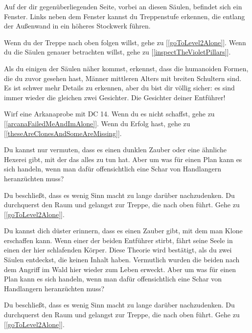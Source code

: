 Auf der dir gegenüberliegenden Seite, vorbei an diesen Säulen, befindet sich ein Fenster. Links neben dem Fenster kannst du Treppenstufe erkennen, die entlang der Außenwand in ein höheres Stockwerk führen.

Wenn du der Treppe nach oben folgen willst, gehe zu [\ref{goToLevel2Alone}].
Wenn du die Säulen genauer betrachten willst, gehe zu [\ref{inspectTheVioletPillars}].


Als du einigen der Säulen näher kommst, erkennst, dass die humanoiden Formen, die du zuvor gesehen hast, Männer mittleren Alters mit breiten Schultern sind. Es ist schwer mehr Details zu erkennen, aber du bist dir völlig sicher: es sind immer wieder die gleichen zwei Gesichter. Die Gesichter deiner Entführer!

Wirf eine Arkanaprobe mit DC 14. Wenn du es nicht schaffst, gehe zu [\ref{arcanaFailedMeAndImAlone}]. Wenn du Erfolg hast, gehe zu [\ref{theseAreClonesAndSomeAreMissing}].


Du kannst nur vermuten, dass es einen dunklen Zauber oder eine ähnliche Hexerei gibt, mit der das alles zu tun hat. Aber um was für einen Plan kann es sich handeln, wenn man dafür offensichtlich eine Schar von Handlangern heranzüchten muss?

Du beschließt, dass es wenig Sinn macht zu lange darüber nachzudenken. Du durchquerst den Raum und gelangst zur Treppe, die nach oben führt.
Gehe zu [\ref{goToLevel2Alone}].


Du kannst dich düster erinnern, dass es einen Zauber gibt, mit dem man Klone erschaffen kann. Wenn einer der beiden Entführer stirbt, fährt seine Seele in einen der hier schlafenden Körper. Diese Theorie wird bestätigt, als du zwei Säulen entdeckst, die keinen Inhalt haben. Vermutlich wurden die beiden nach dem Angriff im Wald hier wieder zum Leben erweckt. Aber um was für einen Plan kann es sich handeln, wenn man dafür offensichtlich eine Schar von Handlangern heranzüchten muss?

Du beschließt, dass es wenig Sinn macht zu lange darüber nachzudenken. Du durchquerst den Raum und gelangst zur Treppe, die nach oben führt.
Gehe zu [\ref{goToLevel2Alone}].


